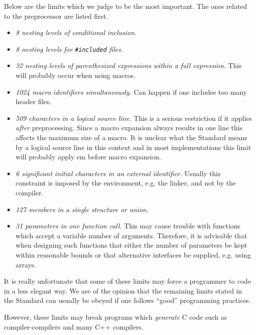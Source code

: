 Below are the limits which we judge to be the most important. The ones
related to the preprocessor are listed first.

\begin{itemize}

\item {\em 8 nesting levels of conditional inclusion.}

\item {\em 8 nesting levels for {\tt \#included} files.}

\item {\em 32 nesting levels of parenthesized expressions within
 a full expression.} This will probably occur when using macros.

\item {\em 1024 macro identifiers simultaneously.} Can happen if
 one includes too many header files.

\item {\em 509 characters in a logical source line.}
 This is a serious restriction if it applies {\em after} preprocessing.
 Since a macro
 expansion always results in one line this affects the maximum
 size of a macro. It is unclear what the Standard means by a logical
 source line in this context and in most implementations this limit
 will probably apply {em before} macro expansion.

\item {\em 6 significant initial characters in an external identifier.}
 Usually this constraint is imposed by the environment, e.g. the linker,
 and not by the compiler.

\item {\em 127 members in a single structure or union.}

\item {\em 31 parameters in one function call.} This may cause trouble
 with functions which accept a variable number of arguments. Therefore,
 it is advisable that when designing such functions that either the
 number of parameters be kept within reasonable bounds or that alternative
 interfaces be supplied, e.g. using arrays.

\end{itemize}

It is really unfortunate that some of these limits may force a programmer
to code in a less elegant way. We are of the opinion that
the remaining limits stated in the Standard can usually be obeyed
if one follows ``good'' programming practices.

However, these limits may break programs which {\em generate} C code
such as compiler-compilers and many C++ compilers.

